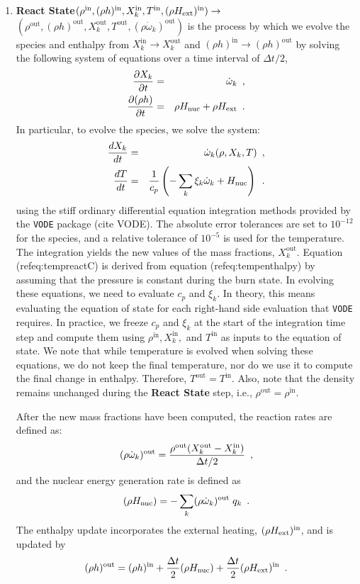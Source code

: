 \documentclass[11pt]{article}
\newcommand{\Hext}{{H_{\rm ext}}}
\newcommand{\Hnuc}{{H_{\rm nuc}}}
\newcommand{\inp}{\mathrm{in}}
\newcommand{\outp}{\mathrm{out}}
\newcommand{\dt}{\Delta t}
\newcommand{\omegadot}{\dot{\omega}}
\begin{document}
\begin{enumerate}
\item {\bf React State}$(\rho^{\inp},(\rho h)^{\inp},X_k^{\inp},T^{\inp}, (\rho\Hext)^{\inp})\rightarrow$
$(\rho^{\outp}, (\rho h)^{\outp}, X_k^{\outp}, T^{\outp}, (\rho \omegadot_k)^{\outp})$ \newline
is the process by which we evolve the species and enthalpy from $X_k^{\inp} \rightarrow X_k^{\outp}$ 
and $(\rho h)^{\inp} \rightarrow (\rho h)^{\outp}$ by solving the following system of equations 
over a time interval of  $\Delta t/2$,
\begin{eqnarray}
\frac{\partial X_k}{\partial t} &=& \omegadot_k\enskip,\\
\frac{\partial (\rho h)}{\partial t} &=& \rho \Hnuc + \rho \Hext\enskip .
\end{eqnarray}
  In particular, to evolve the species, we solve the system:
\begin{eqnarray}
\frac{dX_k}{dt} &=& \omegadot_k(\rho,X_k,T)\enskip, \\
\frac{dT}{dt} &=&\frac{1}{c_p} \left ( -\sum_k \xi_k  \omegadot_k  + \Hnuc \right )\enskip.
\end{eqnarray}
using the stiff ordinary differential equation
 integration methods provided by the {\tt VODE} package (cite VODE).
The absolute error tolerances are set to $10^{-12}$ for the species,
 and a relative tolerance of $10^{-5}$ is used for the temperature.  
The integration yields the new values of the mass fractions, $X_k^{\outp}$.  
Equation (ref{eq:tempreactC}) is derived from equation (ref{eq:tempenthalpy}) by assuming that the pressure is constant during the burn state.  
In evolving these equations, we need to evaluate $c_p$ and $\xi_k$.  
In theory, this means evaluating the equation of state for each right-hand side evaluation that {\tt VODE} requires.  
In practice, we freeze $c_p$ and $\xi_k$ at the start of the integration time step and compute them using 
$\rho^{\inp}, X_k^{\inp},$ and $T^{\inp}$ as inputs to the equation of state.  
We note that while temperature is evolved when solving these equations, we do not keep the final temperature, 
nor do we use it to compute the final change in enthalpy.  
Therefore, $T^{\outp} = T^{\inp}$.  Also, note that the density remains unchanged during 
the {\bf React State} step, i.e., $\rho^{\outp} = \rho^{\inp}$.

After the new mass fractions have been computed, the reaction rates are defined as:
\begin{equation}
(\rho\omegadot_k)^{\outp} = \frac{\rho^{\outp} ( X_k^{\outp} - X_k^{\inp})}{\Delta t /2} \enskip,
\end{equation}
and the nuclear energy generation rate is defined as
\begin{equation}
(\rho\Hnuc) = -\sum_k(\rho\omegadot_k)^{\outp} \; q_k \enskip.
\end{equation}
The enthalpy update incorporates the external heating, $(\rho\Hext)^{\inp}$, and is updated by
\begin{equation}
(\rho h)^{\outp} = (\rho h)^{\inp} + \frac{\dt}{2} (\rho\Hnuc) + \frac{\dt}{2} (\rho\Hext)^{\inp}\enskip.
\end{equation}


\end{enumerate}
\end{document}
